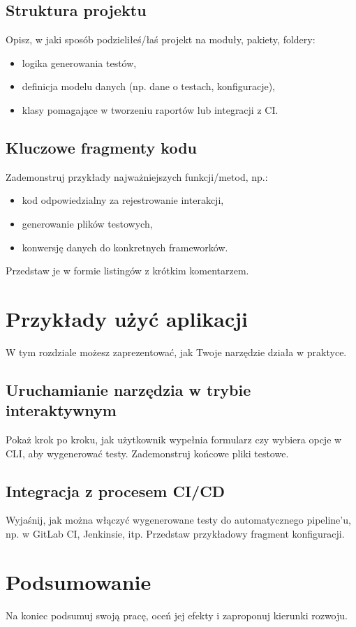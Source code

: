 \documentclass[12pt]{report}
\begin{document}
\section{Struktura projektu}
{Opisz, w jaki sposób podzieliłeś/łaś projekt na moduły, pakiety, foldery:
\begin{itemize}
    \item logika generowania testów,
    \item definicja modelu danych (np. dane o testach, konfiguracje),
    \item klasy pomagające w tworzeniu raportów lub integracji z CI.
\end{itemize}}

\section{Kluczowe fragmenty kodu}
{Zademonstruj przykłady najważniejszych funkcji/metod, np.:
\begin{itemize}
    \item kod odpowiedzialny za rejestrowanie interakcji,
    \item generowanie plików testowych,
    \item konwersję danych do konkretnych frameworków.
\end{itemize}
Przedstaw je w formie listingów z krótkim komentarzem.}

\chapter{Przykłady użyć aplikacji}
{W tym rozdziale możesz zaprezentować, jak Twoje narzędzie działa w praktyce.}

\section{Uruchamianie narzędzia w trybie interaktywnym}
{Pokaż krok po kroku, jak użytkownik wypełnia formularz czy wybiera opcje w CLI, aby wygenerować testy. Zademonstruj końcowe pliki testowe.}

\section{Integracja z procesem CI/CD}
{Wyjaśnij, jak można włączyć wygenerowane testy do automatycznego pipeline’u, np. w GitLab CI, Jenkinsie, itp. Przedstaw przykładowy fragment konfiguracji.}

\chapter{Podsumowanie}
{Na koniec podsumuj swoją pracę, oceń jej efekty i zaproponuj kierunki rozwoju.}
\end{document}
